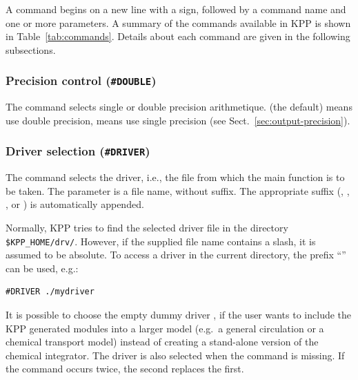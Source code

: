 \documentclass[twoside]{article}
\begin{document}
A command begins on a new line with a \code{#} sign, followed by a
command name and one or more parameters. A summary of the commands
available in KPP is shown in Table~\ref{tab:commands}. Details about
each command are given in the following subsections.

\subsubsection{Precision control ({\tt\#DOUBLE})}
\label{sec:command-double}

The  command selects single or double precision
arithmetique.  (the default) means use double precision,
 means use single precision (see
Sect.~\ref{sec:output-precision}).

\subsubsection{Driver selection ({\tt\#DRIVER})}
\label{sec:command-driver}

The  command selects the driver, i.e., the file from which
the main function is to be taken. The parameter is a file name, without
suffix. The appropriate suffix (, , ,
or ) is automatically appended.

Normally, KPP tries to find the selected driver file in the directory
\verb|$KPP_HOME/drv/|.
However, if the supplied file name contains a slash, it is assumed to be
absolute. To access a driver in the current directory, the prefix
``'' can be used, e.g.:
%
\begin{verbatim}
#DRIVER ./mydriver
\end{verbatim}
%
It is possible to choose the empty dummy driver , if the user
wants to include the KPP generated modules into a larger model (e.g.\ a
general circulation or a chemical transport model) instead of creating a
stand-alone version of the chemical integrator. The driver 
is also selected when the  command is missing. If the
 command occurs twice, the second replaces the first.

\end{document}
